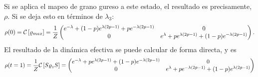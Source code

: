 Si se aplica el mapeo de grano gureso a este estado, el resultado es precisamente, $\rho$. Si se deja esto en términos de $\lambda_{3}$:
\begin{equation}
\rho(0)=\mathcal{C}\left[\varrho_{max}\right]=\frac{1}{Z}\begin{pmatrix}
 e^{-\lambda }+(1-p)e^{\lambda  (2 p-1)}+p e^{-\lambda  (2 p-1)} & 0 \\
 0 & e^{\lambda }+p e^{\lambda  (2 p-1)}+(1-p)e^{-\lambda  (2 p-1)} \\
\end{pmatrix}.
\end{equation}
El resultado de la dinámica efectiva se puede calcular de forma directa, y es
\begin{equation}
\rho(t=1)=\frac{1}{Z}\mathcal{C}\left[S\varrho_{z} S\right]=
\begin{pmatrix}
 e^{-\lambda }+p e^{\lambda  (2 p-1)}+(1-p) e^{-\lambda  (2 p-1)} & 0 \\
 0 & e^{\lambda }+p e^{-\lambda  (2 p-1)}+(1-p)e^{\lambda  (2 p-1)} \\
\end{pmatrix}
\end{equation}

